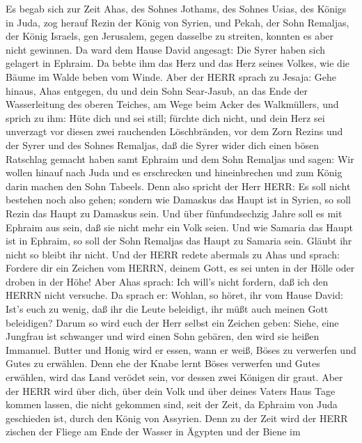  Es begab sich zur Zeit Ahas, des Sohnes Jothams, des Sohnes
Usias, des Königs in Juda, zog herauf Rezin der König von Syrien, und
Pekah, der Sohn Remaljas, der König Israels, gen Jerusalem, gegen
dasselbe zu streiten, konnten es aber nicht gewinnen.  Da
ward dem Hause David angesagt: Die Syrer haben sich gelagert in Ephraim.
Da bebte ihm das Herz und das Herz seines Volkes, wie die Bäume im Walde
beben vom Winde.  Aber der HERR sprach zu Jesaja: Gehe
hinaus, Ahas entgegen, du und dein Sohn Sear-Jasub, an das Ende der
Wasserleitung des oberen Teiches, am Wege beim Acker des Walkmüllers,
 und sprich zu ihm: Hüte dich und sei still; fürchte dich
nicht, und dein Herz sei unverzagt vor diesen zwei rauchenden
Löschbränden, vor dem Zorn Rezins und der Syrer und des Sohnes Remaljas,
 daß die Syrer wider dich einen bösen Ratschlag gemacht
haben samt Ephraim und dem Sohn Remaljas und sagen:  Wir
wollen hinauf nach Juda und es erschrecken und hineinbrechen und zum
König darin machen den Sohn Tabeels.  Denn also spricht der
Herr HERR: Es soll nicht bestehen noch also gehen;  sondern
wie Damaskus das Haupt ist in Syrien, so soll Rezin das Haupt zu
Damaskus sein. Und über fünfundsechzig Jahre soll es mit Ephraim aus
sein, daß sie nicht mehr ein Volk seien.  Und wie Samaria
das Haupt ist in Ephraim, so soll der Sohn Remaljas das Haupt zu Samaria
sein. Gläubt ihr nicht so bleibt ihr nicht.  Und der HERR
redete abermals zu Ahas und sprach:  Fordere dir ein
Zeichen vom HERRN, deinem Gott, es sei unten in der Hölle oder droben in
der Höhe!  Aber Ahas sprach: Ich will's nicht fordern, daß
ich den HERRN nicht versuche.  Da sprach er: Wohlan, so
höret, ihr vom Hause David: Ist's euch zu wenig, daß ihr die Leute
beleidigt, ihr müßt auch meinen Gott beleidigen?  Darum so
wird euch der Herr selbst ein Zeichen geben: Siehe, eine Jungfrau ist
schwanger und wird einen Sohn gebären, den wird sie heißen Immanuel.
 Butter und Honig wird er essen, wann er weiß, Böses zu
verwerfen und Gutes zu erwählen.  Denn ehe der Knabe lernt
Böses verwerfen und Gutes erwählen, wird das Land verödet sein, vor
dessen zwei Königen dir graut.  Aber der HERR wird über
dich, über dein Volk und über deines Vaters Haus Tage kommen lassen, die
nicht gekommen sind, seit der Zeit, da Ephraim von Juda geschieden ist,
durch den König von Assyrien.  Denn zu der Zeit wird der
HERR zischen der Fliege am Ende der Wasser in Ägypten und der Biene im
